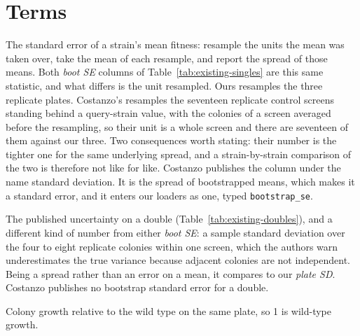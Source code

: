 
\section{Terms}\label{sec:terms}

\begin{description}[leftmargin=1.2em,itemsep=2pt,topsep=2pt]

\item[boot SE] The standard error of a strain's mean fitness: resample the units
  the mean was taken over, take the mean of each resample, and report the spread
  of those means. Both \emph{boot SE} columns of
  Table~\ref{tab:existing-singles} are this same statistic, and what differs is
  the unit resampled. Ours resamples the three replicate plates. Costanzo's
  resamples the seventeen replicate control screens standing behind a query-strain
  value, with the colonies of a screen averaged before the resampling, so their
  unit is a whole screen and there are seventeen of them against our three. Two
  consequences worth stating: their number is the tighter one for the same
  underlying spread, and a strain-by-strain comparison of the two is therefore not
  like for like. Costanzo publishes the column under the name standard deviation.
  It is the spread of bootstrapped means, which makes it a standard error, and it
  enters our loaders as one, typed \texttt{bootstrap\_se}.

\item[colony SD] The published uncertainty on a double
  (Table~\ref{tab:existing-doubles}), and a different kind of number from either
  \emph{boot SE}: a sample standard deviation over the four to eight replicate
  colonies within one screen, which the authors warn underestimates the true
  variance because adjacent colonies are not independent. Being a spread rather
  than an error on a mean, it compares to our \emph{plate SD}. Costanzo publishes
  no bootstrap standard error for a double.

\item[fitness] Colony growth relative to the wild type on the same plate, so 1
  is wild-type growth.


\end{description}
